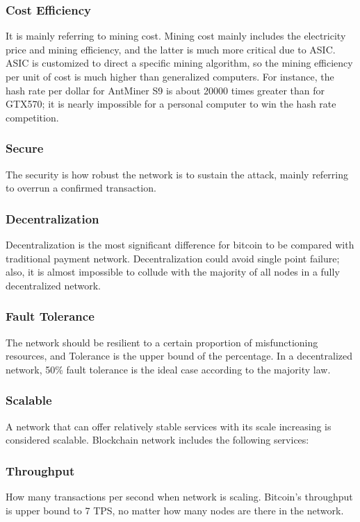 \documentclass[a4paper,11pt]{article}
\begin{document}
\subsubsection*{Cost Efficiency}
It is mainly referring to mining cost. Mining cost mainly includes the electricity price and mining efficiency, and the latter is much more critical due to ASIC. ASIC is customized to direct a specific mining algorithm, so the mining efficiency per unit of cost is much higher than generalized computers. For instance, the hash rate per dollar for AntMiner S9 is about 20000 times greater than for GTX570; it is nearly impossible for a personal computer to win the hash rate competition.

\subsubsection{Secure}
The security is how robust the network is to sustain the attack, mainly referring to overrun a confirmed transaction.

\subsubsection*{Decentralization}
Decentralization is the most significant difference for bitcoin to be compared with traditional payment network. Decentralization could avoid single point failure; also, it is almost impossible to collude with the majority of all nodes in a fully decentralized network.
\subsubsection*{Fault Tolerance}
The network should be resilient to a certain proportion of misfunctioning resources, and  Tolerance is the upper bound of the percentage. In a decentralized network, 50\% fault tolerance is the ideal case according to the majority law.

\subsubsection{Scalable}
A network that can offer relatively stable services with its scale increasing is considered scalable. Blockchain network includes the following services:
\subsubsection*{Throughput}
How many transactions per second when network is scaling. Bitcoin's throughput is upper bound to 7 TPS, no matter how many nodes are there in the network.
\end{document}
